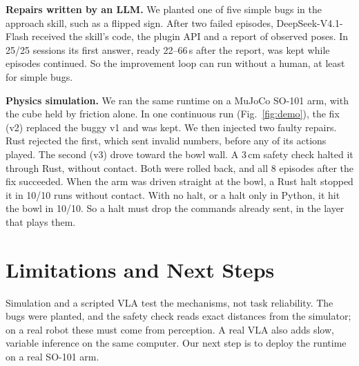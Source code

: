 \documentclass[letterpaper]{article}
\begin{document}
\textbf{Repairs written by an LLM.} We planted one of five simple bugs in the approach skill, such as a flipped sign. After two failed episodes, DeepSeek-V4.1-Flash received the skill's code, the plugin API and a report of observed poses. In 25/25 sessions its first answer, ready 22--66\,s after the report, was kept while episodes continued. So the improvement loop can run without a human, at least for simple bugs.

\textbf{Physics simulation.} We ran the same runtime on a MuJoCo SO-101 arm, with the cube held by friction alone. In one continuous run (Fig.~\ref{fig:demo}), the fix (v2) replaced the buggy v1 and was kept. We then injected two faulty repairs. Rust rejected the first, which sent invalid numbers, before any of its actions played. The second (v3) drove toward the bowl wall. A 3\,cm safety check halted it through Rust, without contact. Both were rolled back, and all 8 episodes after the fix succeeded. When the arm was driven straight at the bowl, a Rust halt stopped it in 10/10 runs without contact. With no halt, or a halt only in Python, it hit the bowl in 10/10. So a halt must drop the commands already sent, in the layer that plays them.

\section{Limitations and Next Steps}
Simulation and a scripted VLA test the mechanisms, not task reliability. The bugs were planted, and the safety check reads exact distances from the simulator; on a real robot these must come from perception. A real VLA also adds slow, variable inference on the same computer. Our next step is to deploy the runtime on a real SO-101 arm.


\end{document}
